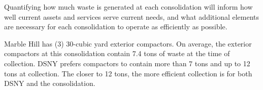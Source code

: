 
    Quantifying how much waste is generated at each consolidation will inform how well current assets and services serve current needs, and what additional elements are necessary for each consolidation to operate as efficiently as possible.
    
    Marble Hill has (3) 30-cubic yard exterior compactors. On average, the exterior compactors at this consolidation contain 7.4 tons of waste at the time of collection. DSNY prefers compactors to contain more than 7 tons and up to 12 tons at collection. The closer to 12 tons, the more efficient collection is for both DSNY and the consolidation.